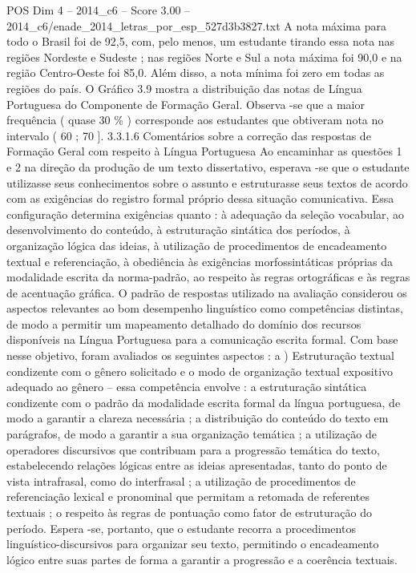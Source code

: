 \begin{textsample}{POS Dim 4 – 2014\_c6 – Score 3.00 – 2014\_c6/enade\_2014\_letras\_por\_esp\_527d3b3827.txt}
A nota máxima para todo o Brasil foi de 92,5, com, pelo menos, um estudante tirando essa nota nas regiões Nordeste e Sudeste ; nas regiões Norte e Sul a nota máxima foi 90,0 e na região Centro-Oeste foi 85,0.
Além disso, a nota mínima foi zero em todas as regiões do país.
O Gráfico 3.9 mostra a distribuição das notas de Língua Portuguesa do Componente de Formação Geral.
Observa -se que a maior frequência ( quase 30 \% ) corresponde aos estudantes que obtiveram nota no intervalo ( 60 ; 70 ]. 3.3.1.6 Comentários sobre a correção das respostas de Formação Geral com respeito à Língua Portuguesa Ao encaminhar as questões 1 e 2 na direção da produção de um texto dissertativo, esperava -se que o estudante utilizasse seus conhecimentos sobre o assunto e estruturasse seus textos de acordo com as exigências do registro formal próprio dessa situação comunicativa.
Essa configuração determina exigências quanto : à adequação da seleção vocabular, ao desenvolvimento do conteúdo, à estruturação sintática dos períodos, à organização lógica das ideias, à utilização de procedimentos de encadeamento textual e referenciação, à obediência às exigências morfossintáticas próprias da modalidade escrita da norma-padrão, ao respeito às regras ortográficas e às regras de acentuação gráfica.
O padrão de respostas utilizado na avaliação considerou os aspectos relevantes ao bom desempenho linguístico como competências distintas, de modo a permitir um mapeamento detalhado do domínio dos recursos disponíveis na Língua Portuguesa para a comunicação escrita formal.
Com base nesse objetivo, foram avaliados os seguintes aspectos : a ) Estruturação textual condizente com o gênero solicitado e o modo de organização textual expositivo adequado ao gênero – essa competência envolve : a estruturação sintática condizente com o padrão da modalidade escrita formal da língua portuguesa, de modo a garantir a clareza necessária ; a distribuição do conteúdo do texto em parágrafos, de modo a garantir a sua organização temática ; a utilização de operadores discursivos que contribuam para a progressão temática do texto, estabelecendo relações lógicas entre as ideias apresentadas, tanto do ponto de vista intrafrasal, como do interfrasal ; a utilização de procedimentos de referenciação lexical e pronominal que permitam a retomada de referentes textuais ; o respeito às regras de pontuação como fator de estruturação do período.
Espera -se, portanto, que o estudante recorra a procedimentos linguístico-discursivos para organizar seu texto, permitindo o encadeamento lógico entre suas partes de forma a garantir a progressão e a coerência textuais.

\end{textsample}
